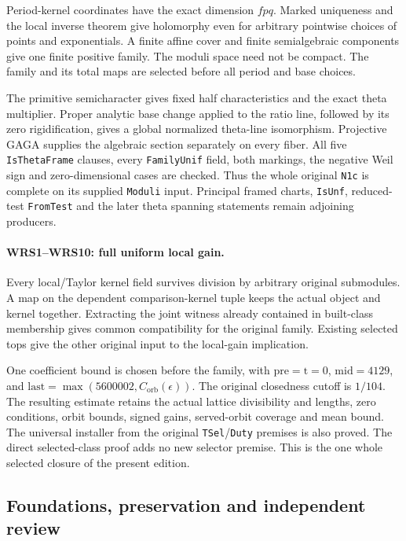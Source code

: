 \documentclass[11pt,a4paper]{article}
\numberwithin{equation}{section}
\theoremstyle{remark}\newtheorem{remark}[theorem]{Remark}
\begin{document}
Period-kernel coordinates have the exact dimension \(fpq\).
Marked uniqueness and the local inverse theorem give holomorphy even
for arbitrary pointwise choices of points and exponentials. A finite
affine cover and finite semialgebraic components give one finite
positive family. The moduli space need not be compact. The family
and its total maps are selected before all period and base choices.

The primitive semicharacter gives fixed half characteristics and the
exact theta multiplier. Proper analytic base change applied to the
ratio line, followed by its zero rigidification, gives a global
normalized theta-line isomorphism. Projective GAGA supplies the
algebraic section separately on every fiber. All five
\texttt{Is\allowbreak Theta\allowbreak Frame} clauses, every \texttt{Family\allowbreak Unif} field,
both markings, the negative Weil sign and zero-dimensional cases
are checked. Thus the whole original \texttt{N1c} is complete
on its supplied \texttt{Moduli} input. Principal framed charts,
\texttt{Is\allowbreak Unf}, reduced-test \texttt{From\allowbreak Test} and the later theta
spanning statements remain adjoining producers.

\paragraph{WRS1--WRS10: full uniform local gain.}
Every local/Taylor kernel field survives division by arbitrary
original submodules. A map on the dependent comparison-kernel tuple
keeps the actual object and kernel together. Extracting the joint
witness already contained in built-class membership gives common
compatibility for the original family. Existing selected tops give
the other original input to the local-gain implication.

One coefficient bound is chosen before the family, with
\(\mathrm{pre}=\mathrm{t}=0\), \(\mathrm{mid}=4129\), and
\(\mathrm{last}=\max(5600002,C_{\mathrm{orb}}(\epsilon))\).
The original closedness cutoff is \(1/104\). The resulting estimate
retains the actual lattice divisibility and lengths, zero conditions,
orbit bounds, signed gains, served-orbit coverage and mean bound.
The universal installer from the original \texttt{TSel}/\texttt{Duty}
premises is also proved. The direct selected-class proof adds no
new selector premise. This is the one whole selected closure of
the present edition.

\subsection{Foundations, preservation and independent review}
\end{document}
